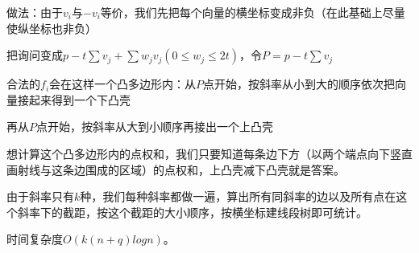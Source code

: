 \begin{frame}
    做法：由于$v_{i}$与$-v_{i}$等价，我们先把每个向量的横坐标变成非负（在此基础上尽量使纵坐标也非负）
    
    把询问变成$p-t\sum v_{j}+\sum w_{j}v_{j}(0 \le w_j \le 2t)$，令$P=p-t\sum v_{j}$
    
    合法的$f_{i}$会在这样一个凸多边形内：从$P$点开始，按斜率从小到大的顺序依次把向量接起来得到一个下凸壳
    
    再从$P$点开始，按斜率从大到小顺序再接出一个上凸壳
    
    想计算这个凸多边形内的点权和，我们只要知道每条边下方（以两个端点向下竖直画射线与这条边围成的区域）的点权和，上凸壳减下凸壳就是答案。
    
    由于斜率只有$k$种，我们每种斜率都做一遍，算出所有同斜率的边以及所有点在这个斜率下的截距，按这个截距的大小顺序，按横坐标建线段树即可统计。
    
    时间复杂度$O(k(n+q)logn)$。
\end{frame}
